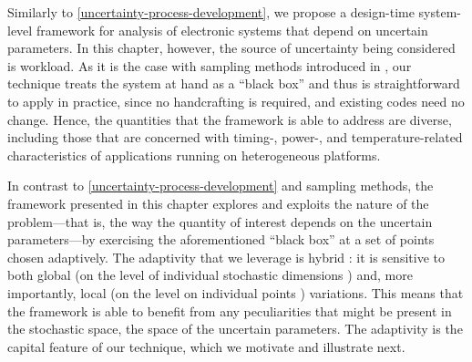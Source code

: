 Similarly to \cref{uncertainty-process-development}, we propose a design-time
system-level framework for analysis of electronic systems that depend on
uncertain parameters. In this chapter, however, the source of uncertainty being
considered is workload. As it is the case with sampling methods introduced in
, our technique treats the system at hand as a ``black box'' and thus
is straightforward to apply in practice, since no handcrafting is required, and
existing codes need no change. Hence, the quantities that the framework is able
to address are diverse, including those that are concerned with timing-, power-,
and temperature-related characteristics of applications running on heterogeneous
platforms.

In contrast to \cref{uncertainty-process-development} and sampling methods, the
framework presented in this chapter explores and exploits the nature of the
problem---that is, the way the quantity of interest depends on the uncertain
parameters---by exercising the aforementioned ``black box'' at a set of points
chosen adaptively. The adaptivity that we leverage is hybrid \cite{jakeman2012}:
it is sensitive to both global (on the level of individual stochastic dimensions
\cite{klimke2006}) and, more importantly, local (on the level on individual
points \cite{ma2009}) variations. This means that the framework is able to
benefit from any peculiarities that might be present in the stochastic space,
the space of the uncertain parameters. The adaptivity is the capital feature of
our technique, which we motivate and illustrate next.
